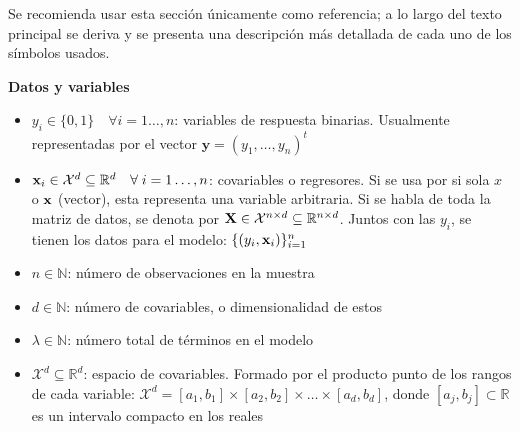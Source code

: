 \documentclass[../../Main/Main.tex]{subfiles}
\begin{document}
Se recomienda usar esta sección únicamente como referencia; a lo largo del texto principal se deriva y se presenta una descripción más detallada de cada uno de los símbolos usados. 

\textbf{Datos y variables}
\begin{itemize}[label={}]
	\item $y_i \in \{0,1\}\quad \forall i = 1\ldots,n$: variables de respuesta binarias. Usualmente representadas por el vector $\mathbf{y} = (y_1,\ldots,y_n)^t$
	\item $\mathbf{x}_i \in \mathcal{X}^d \subseteq \mathbb{R}^d\quad \forall \; i = 1\ldots,n$: covariables o regresores. Si se usa por si sola $x$ o $\mathbf{x}$ (vector), esta representa una variable arbitraria. Si se habla de toda la matriz de datos, se denota por $\mathbf{X} \in \mathcal{X}^{n\times d}\subseteq \mathbb{R}^{n\times d}$. Juntos con las $y_i$, se tienen los datos para el modelo: $\{(y_i,\mathbf{x}_i)\}_{i = 1}^n$
	\item $n \in \mathbb{N}$: número de observaciones en la muestra
	\item $d \in \mathbb{N}$: número de covariables, o dimensionalidad de estos
	\item $\lambda \in \mathbb{N}$: número total de términos en el modelo
	\item $\mathcal{X}^d \subseteq \mathbb{R}^d$: espacio de covariables. Formado por el producto punto de los rangos de cada variable: $\mathcal{X}^d = [a_1,b_1]\times[a_2,b_2]\times\ldots\times[a_d,b_d]$, donde $[a_j,b_j] \subset \mathbb{R}$ es un intervalo compacto en los reales
\end{itemize}
\end{document}
